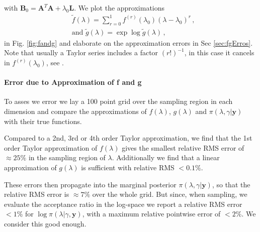 with $\bm{B}_0 = \bm{A}^T  \bm{A} + \lambda_0 \bm{L}$.
We plot the approximations
\begin{subequations}
	\label{eq:fandg}
	\begin{align}
		&\tilde{f} ( \lambda) = \sum^1_{r=0} 	f^{(r)}(\lambda_0) (\lambda-\lambda_0)^r  \label{eq:fAprox} \, ,  \\
		&\text{and } \tilde{g} (\lambda) = \exp \log{\tilde{g}(\lambda)}  \label{eq:gAprox} \, ,
	\end{align}
\end{subequations} in Fig. \ref{fig:fandg} and elaborate on the approximation errors in Sec \ref{sec:fgErros}.
Note that usually a Taylor series includes a factor $(r!)^{-1}$, in this case it cancels in $f^{(r)}(\lambda_0)$, see \cite{fox2016fast}.

\paragraph{Error due to Approximation of f and g}
\label{par:fgErros}
To asses we error we lay a 100 point grid over the sampling region in each dimension and compare the approximations of $f(\lambda)$, $g(\lambda)$ and $\pi(\lambda, \gamma | \bm{y})$ with their true functions.

Compared to a 2nd, 3rd or 4th order Taylor approximation, we find that the 1st order Taylor approximation of $f(\lambda)$ gives the smallest relative RMS error of $\approx 25 \%$ in the sampling region of $\lambda$.
Additionally we find that a linear approximation of $g(\lambda)$ is sufficient with relative RMS $<0.1\%$.

These errors then propagate into the marginal posterior $\pi(\lambda , \gamma| \bm{y})$, so that the relative RMS error is $\approx 7 \%$ over the whole grid.
But since, when sampling, we evaluate the acceptance ratio in the log-space we report a relative RMS error $< 1\%$ for $\log{\pi(\lambda| \gamma, \bm{y})}$, with a maximum relative pointwise error of $< 2\%$.
We consider this good enough.

